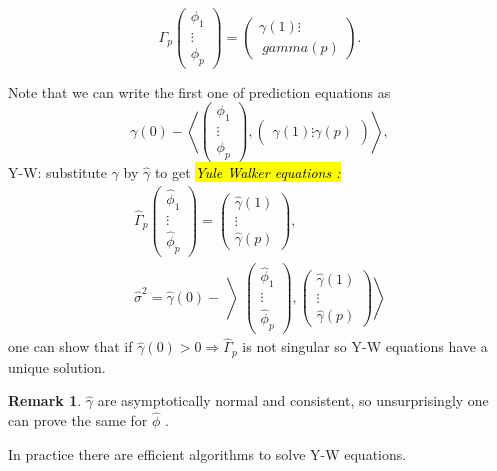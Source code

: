 \documentclass[12pt,a4paper, notitlepage]{book}
\newcommand{\hlc}[2][yellow]{ {\sethlcolor{#1} \hl{#2}} }
\theoremstyle{definition} %
\newtheorem*{remark}{Remark}
\theoremstyle{plain} %
\newcommand{\Important}[1]{ {\it \hlc{#1} } }
\begin{document}
\[ \Gamma _p \left( \begin{array}{c} \phi _1 \\ \vdots \\ \phi _p \end{array} \right) = \left( \begin{array}{c} \gamma (1) \vdots \\ \ gamma (p) \end{array} \right) . \]

Note that we can write the first one of prediction equations as
\[ \gamma (0)  - \left< \left( \begin{array} {c} \phi _1 \\ \vdots \\ \phi _p \end{array} \right) , \left( \begin{array} {c} \gamma(1) \vdots \gamma(p) \end{array} \right) \right> , \]
Y-W: substitute $ \gamma $ by $ \hat{\gamma} $ to get 
\Important{ Yule Walker equations : }
\begin{align*}
 \hat{\Gamma} _p  \left( \begin{array} {c} \hat{\phi} _1 \\ \vdots \\ \hat{\phi} _p \end{array} \right) = \left( \begin{array}{c} \hat{\gamma}(1) \\ \vdots \\ \hat{\gamma}(p) \end{array} \right)  , \\
\hat{\sigma} ^2 = \hat{\gamma}(0) - \left> \left(\begin{array}{c} \hat{\phi}_1 \\ \vdots \\ \hat{\phi}_p \end{array} \right) , \left( \begin{array}{c} \hat{\gamma}(1) \\ \vdots \\ \hat{\gamma} (p) \end{array} \right) \right> 
\end{align*} 
one can show that if $ \hat{\gamma}(0) >0 \Rightarrow \hat{ \Gamma} _p $ is not singular so 
Y-W equations have a unique solution.

\begin{remark}
$ \hat{\gamma} $ are asymptotically normal and consistent, so unsurprisingly one can prove the same for $ \hat{\phi} $ .

In practice there are efficient algorithms to solve Y-W equations.
\end{remark}
\end{document}
